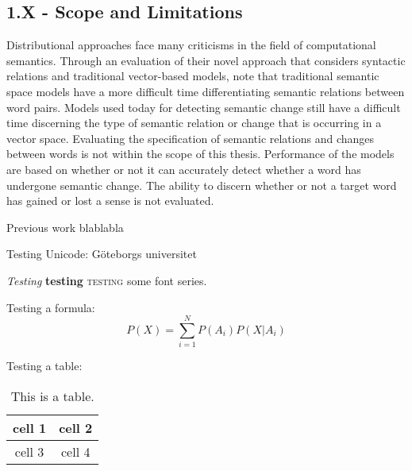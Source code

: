 \subsection{1.X - Scope and Limitations}
Distributional approaches face many criticisms in the field of computational semantics. Through an evaluation of their novel approach that considers syntactic relations and traditional vector-based models, \citet{pado-lapata-2003-constructing} note that traditional semantic space models have a more difficult time differentiating semantic relations between word pairs. Models used today for detecting semantic change still have a difficult time discerning the type of semantic relation or change that is occurring in a vector space. Evaluating the specification of semantic relations and changes between words is not within the scope of this thesis. Performance of the models are based on whether or not it can accurately detect whether a word has undergone semantic change. The ability to discern whether or not a target word has gained or lost a sense is not evaluated. 

Previous work \citep{hengchen2021SBXrushifteval} blablabla 

Testing Unicode: Göteborgs universitet

\textit{Testing} \textbf{testing} \textsc{testing} some font series.

Testing a formula:
\[
P(X) = \sum_{i=1}^N P(A_i) P(X|A_i)
\]

Testing a table:
\begin{table}[htbp]
\begin{center}
\begin{tabular}{c|c}
cell 1 & cell 2 \\
\hline
cell 3 & cell 4
\end{tabular}
\caption{This is a table.}
\end{center}
\end{table}
